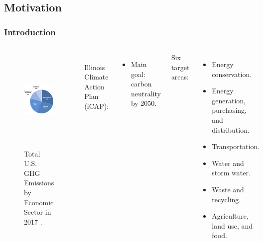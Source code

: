 \subsection{Motivation}
\begin{frame}
\frametitle{Introduction}
\begin{columns}
    \column[t]{5cm}
	\begin{figure}[htbp!]
		\begin{center}
			\includegraphics[height=5.0cm]{images/total-ghg-2017.png}
		\end{center}
		\caption{Total U.S. GHG Emissions by Economic Sector in 2017 \cite{us_epa_sources_2020}.}
	\end{figure}

	\column[t]{5cm}
	\\
	Illinois Climate Action Plan (iCAP):
	\begin{itemize}
		\item Main goal: carbon neutrality by 2050.
	\end{itemize}
	\vspace{0.75cm}
	Six target areas:
	\begin{itemize}
		\item Energy conservation.
		\item Energy generation, purchasing, and distribution.
		\item Transportation.
		\item Water and storm water.
		\item Waste and recycling.
		\item Agriculture, land use, and food.
	\end{itemize}
\end{columns}
\end{frame}


